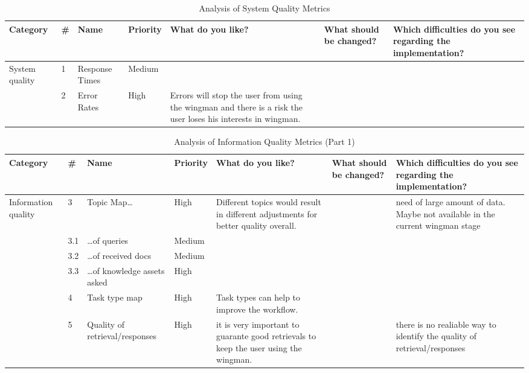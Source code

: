 \documentclass[
	english,
	ruledheaders=section,%
	class=report,%
	thesis={type=bachelor},%
	accentcolor=1b,%
	custommargins=true,%
	marginpar=false,%
	parskip=half-,%
	fontsize=11pt,%
	DIV=14,
]{tudapub}
\begin{document}
\begin{table}
    \centering
    \small 
    \caption{Analysis of System Quality Metrics}
    \label{tab:system_quality}
    \begin{tabularx}{\textheight}{p{2.2cm} l >{\RaggedRight\arraybackslash}X l >{\RaggedRight\arraybackslash}X >{\RaggedRight\arraybackslash}X >{\RaggedRight\arraybackslash}X}
        \toprule
        \textbf{Category} & \textbf{\#} & \textbf{Name} & \textbf{Priority} & \textbf{What do you like?} & \textbf{What should be changed?} & \textbf{Which difficulties do you see regarding the implementation?} \\
        \midrule
        
        \multirow{2}{=}{System quality} 
        & 1 & Response Times & Medium & & & \\
        \cmidrule(l){2-7}
        & 2 & Error Rates & High & Errors will stop the user from using the wingman and there is a risk the user loses his interests in wingman. & & \\
        \bottomrule
    \end{tabularx}
\end{table}

\begin{table}
    \centering
    \small 
    \caption{Analysis of Information Quality Metrics (Part 1)}
    \label{tab:info_quality_p1}
    \begin{tabularx}{\textheight}{p{2.2cm} l >{\RaggedRight\arraybackslash}X l >{\RaggedRight\arraybackslash}X >{\RaggedRight\arraybackslash}X >{\RaggedRight\arraybackslash}X}
        \toprule
        \textbf{Category} & \textbf{\#} & \textbf{Name} & \textbf{Priority} & \textbf{What do you like?} & \textbf{What should be changed?} & \textbf{Which difficulties do you see regarding the implementation?} \\
        \midrule
        \multirow{6}{=}{Information quality} 
        & 3 & Topic Map\dots & High & Different topics would result in different adjustments for better quality overall. & & need of large amount of data. Maybe not available in the current wingman stage \\
        \cmidrule(l){2-7}
        & 3.1 & \dots of queries & Medium & & & \\
        \cmidrule(l){2-7}
        & 3.2 & \dots of received docs & Medium & & & \\
        \cmidrule(l){2-7}
        & 3.3 & \dots of knowledge assets asked & High & & & \\
        \cmidrule(l){2-7}
        & 4 & Task type map & High & Task types can help to improve the workflow. & & \\
        \cmidrule(l){2-7}
        & 5 & Quality of retrieval/responses & High & it is very important to guarante good retrievals to keep the user using the wingman. & & there is no realiable way to identify the quality of retrieval/responses \\
        \bottomrule
    \end{tabularx}
\end{table}
\end{document}

